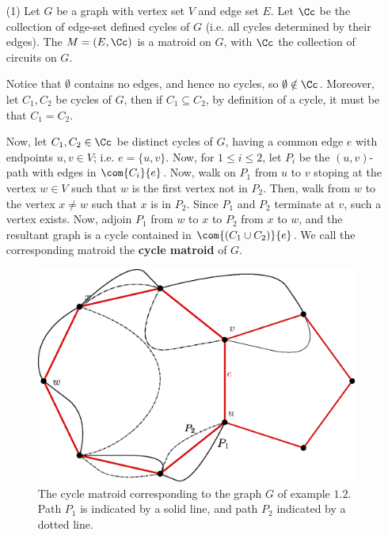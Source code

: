 \begin{example}
    \begin{enumerate}
        \item[(1)] Let $G$ be a graph with vertex set $V$ and edge set  $E$. Let
            $\Cc$ be the collection of edge-set defined cycles of  $G$  (i.e.
            all cycles determined by their edges). The $M=(E,\Cc)$ is a matroid
            on $G$, with  $\Cc$ the collection of circuits on $G$.

            Notice that $\emptyset$ contains no edges, and hence no cycles, so
            $\emptyset \notin \Cc$. Moreover, let $C_1,C_2$ be cycles of $G$,
            then if  $C_1 \subseteq C_2$, by definition of a cycle, it must be
            that $C_1=C_2$.

            Now, let $C_1,C_2 \in \Cc$ be distinct cycles of $G$, having a
            common edge  $e$ with endpoints  $u,v \in V$; i.e.  $e=\{u,v\}$.
            Now, for $1 \leq i \leq 2$, let  $P_i$ be the  $(u,v)$-path with
            edges in $\com{C_i}{e}$. Now, walk on $P_1$ from $u$ to $v$ stoping
            at the vertex $w \in V$ such that  $w$ is the first vertex not in
            $P_2$. Then, walk from $w$ to the vertex  $x \neq w$ such that $x$
            is in  $P_2$. Since $P_1$ and $P_2$ terminate at $v$, such a vertex
            exists. Now, adjoin  $P_1$ from $w$ to  $x$ to  $P_2$ from $x$ to
            $w$, and the resultant graph is a cycle  contained in  $\com{(C_1
            \cup C_2)}{e}$. We call the corresponding matroid the \textbf{cycle
            matroid} of $G$.

            \begin{figure}[h]
                \centering
                \includegraphics[scale=0.5]{Figures/Chapter1/cycle_matroid.eps}
                \caption{The cycle matroid corresponding to the graph $G$ of
                example $1.2$. Path $P_1$ is indicated by a solid line, and path
                $P_2$ indicated by a dotted line.}
                \label{fig_1.1}
            \end{figure}


\end{enumerate}
\end{example}
